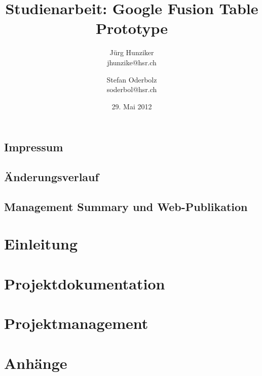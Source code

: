 


\title{Studienarbeit: Google Fusion Table Prototype}
\author{Jürg Hunziker\\jhunzike@hsr.ch
		\and
		Stefan Oderbolz\\soderbol@hsr.ch}

\date{29. Mai 2012}
\maketitle



\listoftodos

\chapter*{Impressum}


\chapter*{Änderungsverlauf}




\chapter*{Management Summary und Web-Publikation}


\tableofcontents

\part{Einleitung}


\part{Projektdokumentation}


\part{Projektmanagement}


\part{Anhänge}

\printglossary[style=altlist,title=Glossar,toctitle=Glossar]




\listoffigures

